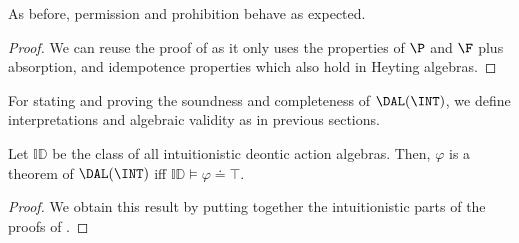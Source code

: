 As before, permission and prohibition behave as expected.

\medskip
{}
\medskip
\begin{proof}
	We can reuse the proof of  as it only uses the properties of $\P$ and $\F$ plus absorption, and idempotence properties which also hold in Heyting algebras.
\end{proof}


For stating and proving the soundness and completeness of $\DAL(\INT)$, we define interpretations and algebraic validity as in previous sections.

\medskip

\begin{theorem}\label{prop:completeness:heyting}
	Let $\mathbb{ID}$ be the class of all intuitionistic deontic action algebras.
	Then, $\varphi$ is a theorem of $\DAL(\INT)$ iff $\mathbb{ID} \vDash {\varphi \doteq \top}$.
\end{theorem}
\begin{proof}
	We obtain this result by putting together the intuitionistic parts of the proofs of
	.
%	
%		
\end{proof}

